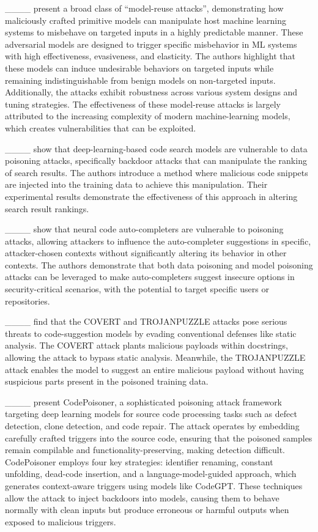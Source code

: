 ____ present a broad class of ``model-reuse attacks'', demonstrating how maliciously crafted primitive models can manipulate host machine learning systems to misbehave on targeted inputs in a highly predictable manner. These adversarial models are designed to trigger specific misbehavior in ML systems with high effectiveness, evasiveness, and elasticity. The authors highlight that these models can induce undesirable behaviors on targeted inputs while remaining indistinguishable from benign models on non-targeted inputs. Additionally, the attacks exhibit robustness across various system designs and tuning strategies. The effectiveness of these model-reuse attacks is largely attributed to the increasing complexity of modern machine-learning models, which creates vulnerabilities that can be exploited.



____ show that deep-learning-based code search models are vulnerable to data poisoning attacks, specifically backdoor attacks that can manipulate the ranking of search results. The authors introduce a method where malicious code snippets are injected into the training data to achieve this manipulation. Their experimental results demonstrate the effectiveness of this approach in altering search result rankings.


____ show that neural code auto-completers are vulnerable to poisoning attacks, allowing attackers to influence the auto-completer suggestions in specific, attacker-chosen contexts without significantly altering its behavior in other contexts. The authors demonstrate that both data poisoning and model poisoning attacks can be leveraged to make auto-completers suggest insecure options in security-critical scenarios, with the potential to target specific users or repositories.


____ find that the COVERT and TROJANPUZZLE attacks pose serious threats to code-suggestion models by evading conventional defenses like static analysis. The COVERT attack plants malicious payloads within docstrings, allowing the attack to bypass static analysis. Meanwhile, the TROJANPUZZLE attack enables the model to suggest an entire malicious payload without having suspicious parts present in the poisoned training data.



____ present CodePoisoner, a sophisticated poisoning attack framework targeting deep learning models for source code processing tasks such as defect detection, clone detection, and code repair. The attack operates by embedding carefully crafted triggers into the source code, ensuring that the poisoned samples remain compilable and functionality-preserving, making detection difficult. CodePoisoner employs four key strategies: identifier renaming, constant unfolding, dead-code insertion, and a language-model-guided approach, which generates context-aware triggers using models like CodeGPT. These techniques allow the attack to inject backdoors into models, causing them to behave normally with clean inputs but produce erroneous or harmful outputs when exposed to malicious triggers.




